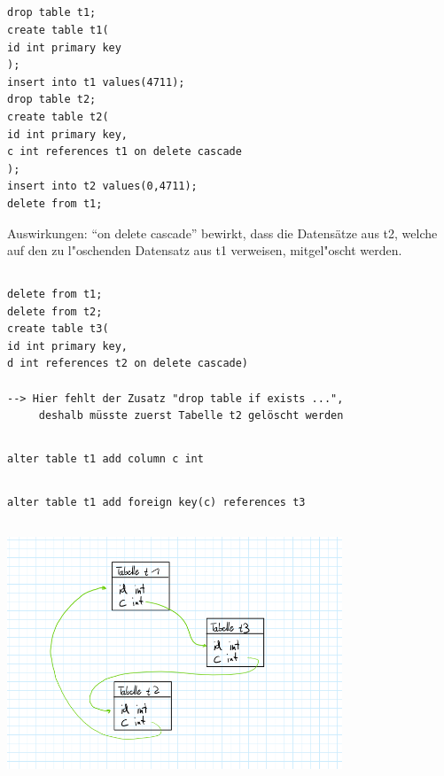 \documentclass[a4paper, 11pt, titlepage]{article}
\begin{document}
\subsection{}
\begin{verbatim}
drop table t1;
create table t1(
id int primary key
);
insert into t1 values(4711);
drop table t2;
create table t2(
id int primary key,
c int references t1 on delete cascade
);
insert into t2 values(0,4711);
delete from t1;
\end{verbatim}
Auswirkungen: "`on delete cascade"' bewirkt, dass die Datensätze aus t2, welche auf den zu l"oschenden Datensatz aus t1 verweisen, mitgel"oscht werden.

\subsection{}
\begin{verbatim}
delete from t1;
delete from t2;
create table t3(
id int primary key,
d int references t2 on delete cascade)

--> Hier fehlt der Zusatz "drop table if exists ...", 
     deshalb müsste zuerst Tabelle t2 gelöscht werden
\end{verbatim}

\subsection{}
\begin{verbatim}
alter table t1 add column c int
\end{verbatim}

\subsection{}
\begin{verbatim}
alter table t1 add foreign key(c) references t3
\end{verbatim}
\subsection{}
\includegraphics [width = 10cm]{Faustskizze_Teilaufgabe_h}\\
\end{document}
